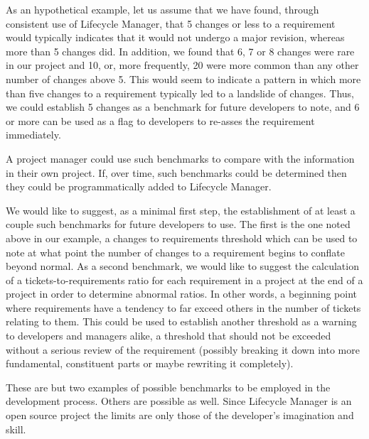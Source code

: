 \documentclass[letterpaper,10pt]{article}
\begin{document}
            As an hypothetical example, let us assume that we have found, 
            through consistent use of Lifecycle Manager, that 5 changes or 
            less to a requirement would typically indicates that it would 
            not undergo a major revision, whereas more than 5 changes did.  
            In addition, we found that 6, 7 or 8 changes were rare in our 
            project and 10, or, more frequently, 20 were more common than 
            any other number of changes above 5.  This would seem to 
            indicate a pattern in which more than five changes to a 
            requirement typically led to a landslide of changes.  Thus, we 
            could establish 5 changes as a benchmark for future developers 
            to note, and 6 or more can be used as a flag to developers to 
            re-asses the requirement immediately.

            A project manager could use such benchmarks to compare with the 
            information in their own project.  If, over time, such 
            benchmarks could be determined then they could be 
            programmatically added to Lifecycle Manager.

            We would like to suggest, as a minimal first step, the 
            establishment of at least a couple such benchmarks for future 
            developers to use.  The first is the one noted above in our 
            example, a changes to requirements threshold which can be used 
            to note at what point the number of changes to a requirement 
            begins to conflate beyond normal.  As a second benchmark, we 
            would like to suggest the calculation of a tickets-to-requirements ratio for each requirement in a project at the end 
            of a project in order to determine abnormal ratios.  In other 
            words, a beginning point where requirements have a tendency to 
            far exceed others in the number of tickets relating to them.  
            This could be used to establish another threshold as a warning 
            to developers and managers alike, a threshold that should not 
            be exceeded without a serious review of the requirement 
            (possibly breaking it down into more fundamental, constituent 
            parts or maybe rewriting it completely).

            These are but two examples of possible benchmarks to be 
            employed in the development process.  Others are possible as 
            well.  Since Lifecycle Manager is an open source project the 
            limits are only those of the developer's imagination and skill.
	
\end{document}
